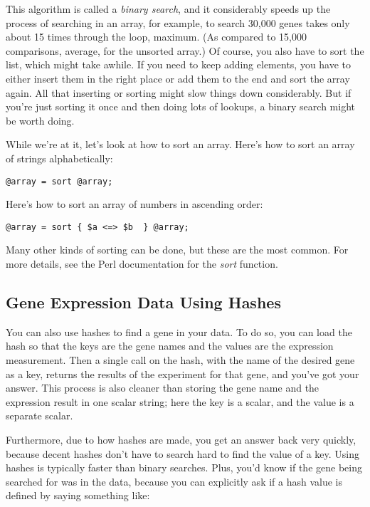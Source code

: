 This algorithm is called a \textit{binary search}, and it considerably speeds up the process of searching in an array, for example, to search 30,000 genes takes only about 15 times through the loop, maximum. (As compared to 15,000 comparisons, average, for the unsorted array.) Of course, you also have to sort the list, which might take awhile. If you need to keep adding elements, you have to either insert them in the right place or add them to the end and sort the array again. All that inserting or sorting might slow things down considerably. But if you're just sorting it once and then doing lots of lookups, a binary search might be worth doing.

While we're at it, let's look at how to sort an array. Here's how to sort an array of strings alphabetically:

\begin{lstlisting}
@array = sort @array;
\end{lstlisting}

Here's how to sort an array of numbers in ascending order:

\begin{lstlisting}
@array = sort { $a <=> $b  } @array;
\end{lstlisting}

Many other kinds of sorting can be done, but these are the most common. For more details, see the Perl documentation for the \textit{sort} function. 

\subsection{Gene Expression Data Using Hashes}
You can also use hashes to find a gene in your data. To do so, you can load the hash so that the keys are the gene names and the values are the expression measurement. Then a single call on the hash, with the name of the desired gene as a key, returns the results of the experiment for that gene, and you've got your answer. This process is also cleaner than storing the gene name and the expression result in one scalar string; here the key is a scalar, and the value is a separate scalar.

Furthermore, due to how hashes are made, you get an answer back very quickly, because decent hashes don't have to search hard to find the value of a key. Using hashes is typically faster than binary searches. Plus, you'd know if the gene being searched for was in the data, because you can explicitly ask if a hash value is defined by saying something like:

